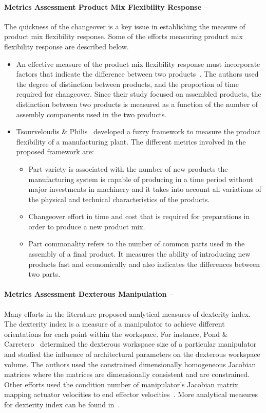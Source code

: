 \paragraph{Metrics Assessment Product Mix Flexibility Response --}
The quickness of the changeover is a key issue in establishing the measure of product mix flexibility response. Some of the efforts measuring product mix flexibility response are described below.
\begin{itemize}
    \item An effective measure of the product mix flexibility response must incorporate factors that indicate the difference between two products~\cite{Das.1993}. The authors used the degree of distinction between products, and the proportion of time required for changeover. Since their study focused on assembled products, the distinction between two products is measured as a function of the number of assembly components used in the two products.
    \item Tsourveloudis \& Philis~\cite{Tsourveloudis.1998} developed a fuzzy framework to measure the product flexibility of a manufacturing plant. The different metrics involved in the proposed framework are:
        \begin{itemize}
            \item Part variety is associated with the number of new products the manufacturing system is capable of producing in a time period without major investments in machinery and it takes into account all variations of the physical and technical characteristics of the products.
            \item Changeover effort in time and cost that is required for preparations in order to produce a new product mix.
            \item Part commonality refers to the number of common parts used in the assembly of a final product. It measures the ability of introducing new products fast and economically and also indicates the differences between two parts.
        \end{itemize}
\end{itemize}

\paragraph{Metrics Assessment Dexterous Manipulation --}

Many efforts in the literature proposed analytical measures of dexterity index. The dexterity index is a measure of a manipulator to achieve different orientations for each point within the workspace. For instance, Pond \& Carretero~\cite{Pond.2011} determined the dexterous workspace size of a particular manipulator and studied the influence of architectural parameters on the dexterous workspace volume. The authors used the constrained dimensionally homogeneous Jacobian matrices where the matrices are dimensionally consistent and are constrained. Other efforts used the condition number of manipulator's Jacobian matrix mapping actuator velocities to end effector velocities~\cite{Gosselin.2009,BADESCU.2004}. More analytical measures for dexterity index can be found in~\cite{Elkady.2010}.

